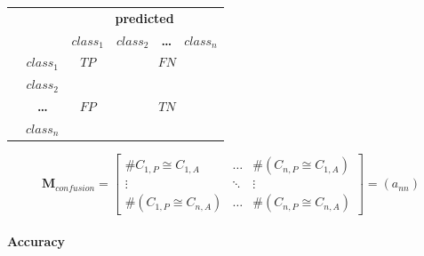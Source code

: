 \documentclass[10pt]{article}
\newif\ifen
\newif\ifde
\newcommand{\en}[1]{\ifen#1\fi}
\newcommand{\de}[1]{\ifde#1\fi}
\begin{document}
				\begin{table}[htb]
					\centering
					{\def\arraystretch{2}\tabcolsep=5pt
						\begin{tabular}{cc|c|c|c|c|}
							\cline{3-6}
							& & \multicolumn{4}{c|}{\textbf{predicted}} \\ \cline{3-6} 
							& & \boldmath\(class_1\) & \boldmath\(class_2\) & \textbf{\ldots} & \boldmath\(class_n\) \\ \hline
							\multicolumn{1}{|l|}{\multirow{4}{*}{\rotatebox{90}{\textbf{actual}}}} & \boldmath\(class_1\) & \(TP\)                  & \multicolumn{3}{c|}{\(FN\)} \\ \cline{2-6} 
							\multicolumn{1}{|c|}{} & \boldmath\(class_2\) & \multirow{3}{*}{\(FP\)} & \multicolumn{3}{c|}{\multirow{3}{*}{\(TN\)}} \\ \cline{2-2}
							\multicolumn{1}{|c|}{} & \textbf{\ldots} & & \multicolumn{3}{c|}{}                   \\ \cline{2-2}
							\multicolumn{1}{|c|}{} & \boldmath\(class_n\) & & \multicolumn{3}{c|}{}                   \\ \hline
						\end{tabular}
					}
					\label{tbl:table_confusion_matrix}
				\end{table}

			 	\de{Zum Schluß besitzt die Confusion Matrix folgenden Aufbau, wobei die Anzahl von Elementen in der Klasse \(C_{i,P}\) vorhergesagt wurde, obwohl (\(\boldsymbol{\cong}\)) es hätte Klasse \(C_{j,A}\) sein müssen:}
				\en{Finally, the Confusion Matrix has the following structure, where the number of elements in the class \(C_{i,P}\) was predicted although (\(\boldsymbol{\cong}\)) it should have been class \(C_{j,A}\):}

				\begin{equation}
					\boldsymbol{M}_{confusion} = \begin{bmatrix}
						\#C_{1,P}\boldsymbol{\cong} C_{1,A} & \dots & \#(C_{n,P}\boldsymbol{\cong} C_{1,A}) \\
						\vdots & \ddots & \vdots \\
						\#(C_{1,P}\boldsymbol{\cong} C_{n,A}) & \dots & \#(C_{n,P}\boldsymbol{\cong} C_{n,A})
					\end{bmatrix} = (a_{nn})
				\end{equation}

			\paragraph{Accuracy}
				\de{Die \textbf{Top-1-Genauigkeit} ist wahrscheinlich die wichtigste Genauigkeit. Sie sagt sagt aus, zu wieviel Prozent die jeweils beste Aussage des Modells auf die Daten des Validierungssets mit der erwarteten Klasse übereinstimmt.}
				\en{\textbf{Top-1 accuracy} is probably the most important accuracy. It tells you the percentage of the model's best prediction of the data in the validation set that matches the expected class.}
\end{document}

